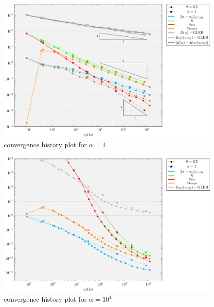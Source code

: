\documentclass[draft=false,twoside,12pt]{scrreprt}
\begin{document}
\vspace{-\parskip}
\begin{figure}[H]
	\centering
	\includegraphics[width=16.5cm]{tikzPlots/f01/alpha1/convergence.pdf}
  \caption{convergence history plot for $\alpha=1$}
\end{figure}

\vspace{-\parskip}
\begin{figure}[H]
	\centering
	\includegraphics[width=16.5cm]{tikzPlots/f01/alpha1e4/convergence.pdf}
  \caption{convergence history plot for $\alpha=10^4$}
\end{figure}
\end{document}

